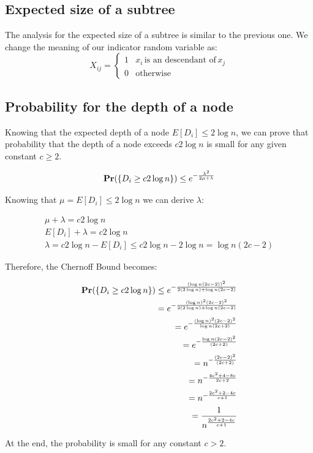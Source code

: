 \documentclass{article}
\begin{document}
\subsection{Expected size of a subtree}

The analysis for the expected size of a subtree is similar to the previous one. We change the meaning of our indicator random variable as:
\begin{equation}
    X_{ij} = \begin{cases}
    1 & x_i \, \textrm{is an descendant of} \, x_j\\
    0 & \textrm{otherwise}
    \end{cases}
\end{equation}

\subsection{Probability for the depth of a node}

\noindent Knowing that the expected depth of a node $E[D_i] \le 2 \log n$, we can prove that probability that the depth
of a node exceeds $c 2 \log n$ is small for any given constant $c \ge 2$.

\begin{align}
    \textrm{\textbf{Pr}}(\{D_i \ge c 2 \log n\}) \le e^{-\frac{\lambda^2}{2 \mu + \lambda}}
\end{align}

\noindent Knowing that $\mu = E[D_i] \le 2 \log n$ we can derive $\lambda$:

\begin{align*}
    \mu + \lambda = c 2 \log n \\
    E[D_i] + \lambda = c 2 \log n \\
    \lambda = c 2 \log n - E[D_i] \le c2 \log n - 2 \log n = \log n(2c - 2)
\end{align*}

\noindent Therefore, the Chernoff Bound becomes:

\begin{align*}
    \textrm{\textbf{Pr}}(\{D_i \ge c 2 \log n\}) \le e^{-\frac{(\log n(2c - 2))^2}{2(2 \log n) + \log n(2c - 2)}} \\
    = e^{-\frac{(\log n)^2 (2c-2)^2}{2(2 \log n) + \log n (2c - 2)}} \\
    = e^{-\frac{(\log n)^2 (2c-2)^2}{\log n (2c + 2)}} \\
    = e^{-\frac{\log n (2c-2)^2}{(2c + 2)}} \\
    = n^{-\frac{(2c-2)^2}{(2c + 2)}} \\
    = n^{-\frac{4c^2 + 4 - 8c}{2c + 2}} \\
    = n^{-\frac{2c^2 + 2 - 4c}{c + 1}} \\
    = \frac{1}{n^{\frac{2c^2 + 2 - 4c}{c + 1}}}
\end{align*}

At the end, the probability is small for any constant $c > 2$.
\end{document}

